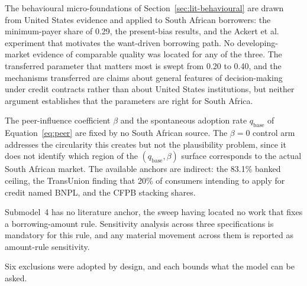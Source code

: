 \label{sec:lim-transfer}%
The behavioural micro-foundations of Section~\ref{sec:lit-behavioural} are drawn from United States
evidence and applied to South African borrowers: the minimum-payer share of 0.29, the present-bias
results, and the Ackert et al. experiment that motivates the want-driven borrowing path. No
developing-market evidence of comparable quality was located for any of the three. The transferred
parameter that matters most is swept from 0.20 to 0.40, and the mechanisms transferred are claims
about general features of decision-making under credit contracts rather than about United States
institutions, but neither argument establishes that the parameters are right for South Africa.

\label{sec:lim-uncalibrated}%
The peer-influence coefficient $\beta$ and the spontaneous adoption rate $q_{\text{base}}$ of
Equation~\ref{eq:peer} are fixed by no South African source. The $\beta = 0$ control arm addresses
the circularity this creates but not the plausibility problem, since it does not identify which
region of the $(q_{\text{base}}, \beta)$ surface corresponds to the actual South African market.
The available anchors are indirect: the 83.1\% banked ceiling, the TransUnion finding that 20\% of
consumers intending to apply for credit named \ac{BNPL}, and the \ac{CFPB} stacking shares.

\label{sec:lim-amount}%
Submodel~4 has no literature anchor, the sweep having located no work that fixes a
borrowing-amount rule. Sensitivity analysis across three specifications is mandatory for this rule,
and any material movement across them is reported as amount-rule sensitivity.

\label{sec:lim-structural}%
Six exclusions were adopted by design, and each bounds what the model can be asked.

